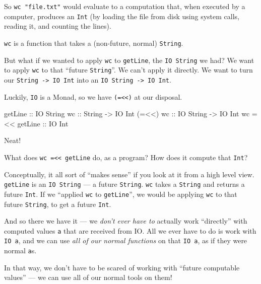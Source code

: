 \documentclass[]{article}
\newenvironment{Shaded}{}{}
\newcommand{\DataTypeTok}[1]{\textcolor[rgb]{0.56,0.13,0.00}{#1}}
\newcommand{\FunctionTok}[1]{\textcolor[rgb]{0.02,0.16,0.49}{#1}}
\newcommand{\NormalTok}[1]{#1}
\newcommand{\OperatorTok}[1]{\textcolor[rgb]{0.40,0.40,0.40}{#1}}
\newcommand{\OtherTok}[1]{\textcolor[rgb]{0.00,0.44,0.13}{#1}}
\begin{document}
So \texttt{wc\ "file.txt"} would evaluate to a computation that, when executed
by a computer, produces an \texttt{Int} (by loading the file from disk using
system calls, reading it, and counting the lines).

\texttt{wc} is a function that takes a (non-future, normal) \texttt{String}.

But what if we wanted to apply \texttt{wc} to \texttt{getLine}, the
\texttt{IO\ String} we had? We want to apply \texttt{wc} to that ``future
\texttt{String}''. We can't apply it directly. We want to turn our
\texttt{String\ -\textgreater{}\ IO\ Int} into an
\texttt{IO\ String\ -\textgreater{}\ IO\ Int}.

Luckily, \texttt{IO} is a Monad, so we have \texttt{(=\textless{}\textless{})}
at our disposal.

\begin{Shaded}
\begin{Highlighting}[]
\FunctionTok{getLine}\OtherTok{        ::} \DataTypeTok{IO} \DataTypeTok{String}
\OtherTok{wc             ::} \DataTypeTok{String} \OtherTok{{-}\textgreater{}} \DataTypeTok{IO} \DataTypeTok{Int}
\NormalTok{(}\OperatorTok{=\textless{}\textless{}}\NormalTok{)}\OtherTok{ wc       ::} \DataTypeTok{IO} \DataTypeTok{String} \OtherTok{{-}\textgreater{}} \DataTypeTok{IO} \DataTypeTok{Int}
\NormalTok{wc }\OperatorTok{=\textless{}\textless{}}\OtherTok{ getLine ::} \DataTypeTok{IO} \DataTypeTok{Int}
\end{Highlighting}
\end{Shaded}

Neat!

What does \texttt{wc\ =\textless{}\textless{}\ getLine} do, as a program? How
does it compute that \texttt{Int}?

Conceptually, it all sort of ``makes sense'' if you look at it from a high level
view. \texttt{getLine} is an \texttt{IO\ String} --- a future \texttt{String}.
\texttt{wc} takes a \texttt{String} and returns a future \texttt{Int}. If we
``applied \texttt{wc} to \texttt{getLine}'', we would be applying \texttt{wc} to
that future \texttt{String}, to get a future \texttt{Int}.

And so there we have it --- we \emph{don't ever have to} actually work
``directly'' with computed values \texttt{a} that are received from IO. All we
ever have to do is work with \texttt{IO\ a}, and we can use \emph{all of our
normal functions} on that \texttt{IO\ a}, as if they were normal \texttt{a}s.

In that way, we don't have to be scared of working with ``future computable
values'' --- we can use all of our normal tools on them!
\end{document}
